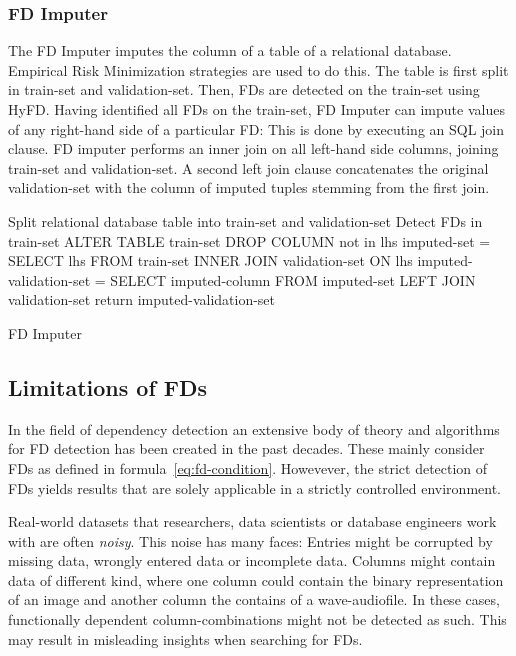 \subsubsection{FD Imputer}
The FD Imputer imputes the column of a table of a relational database.
Empirical Risk Minimization strategies are used to do this.
The table is first split in train-set and validation-set.
Then, FDs are detected on the train-set using HyFD.\cite{PAP16}
Having identified all FDs on the train-set, FD Imputer can impute values of any right-hand side of a particular FD:
This is done by executing an SQL join clause.
FD imputer performs an inner join on all left-hand side columns, joining train-set and validation-set.
A second left join clause concatenates the original validation-set with the column of imputed tuples stemming from the first join.
\begin{algorithm}[H]
    \DontPrintSemicolon
    \SetAlgoLined
    \BlankLine

    Split relational database table into train-set and validation-set\;
    Detect FDs in train-set\;
    ALTER TABLE train-set DROP COLUMN not in lhs\;
    imputed-set = SELECT lhs FROM train-set INNER JOIN validation-set ON lhs\;
    imputed-validation-set = SELECT imputed-column FROM imputed-set LEFT JOIN validation-set\;
    return imputed-validation-set\;
    \caption{FD Imputer}
\end{algorithm}

\subsection{Limitations of FDs}
In the field of dependency detection an extensive body of theory and algorithms for FD detection has been created in the past decades.\cite[p.~1]{PAP15}
These mainly consider FDs as defined in formula~\ref{eq:fd-condition}.
Howevever, the strict detection of FDs yields results that are solely applicable in a strictly controlled environment.

Real-world datasets that researchers, data scientists or database engineers work with are often \emph{noisy}.
This noise has many faces:
Entries might be corrupted by missing data, wrongly entered data or incomplete data.
Columns might contain data of different kind, where one column could contain the binary representation of an image and another column the contains of a wave-audiofile.
In these cases, functionally dependent column-combinations might not be detected as such.
This may result in misleading insights when searching for FDs.

